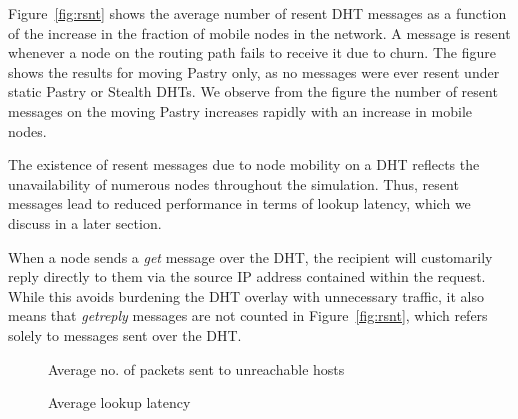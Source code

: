 \documentclass[times, 10pt,twocolumn]{article}
\begin{document}


Figure~\ref{fig:rsnt} shows the average number of resent DHT
messages as a function of the increase in the fraction of mobile
nodes in the network. A message is resent whenever a node on the
routing path fails to receive it due to churn. The figure shows the
results for moving Pastry only, as no messages were ever resent
under static Pastry or Stealth DHTs. We observe from the figure the
number of resent messages on the moving Pastry increases rapidly
with an increase in mobile nodes.

The existence of resent messages due to node mobility on a DHT
reflects the unavailability of numerous nodes throughout the
simulation. Thus, resent messages lead to reduced performance in
terms of lookup latency, which we discuss in a later section.


When a node sends a {\em get} message over the DHT, the recipient
will customarily reply directly to them via the source IP address
contained within the request. While this avoids burdening the DHT
overlay with unnecessary traffic, it also means that {\em getreply}
messages are not counted in Figure~\ref{fig:rsnt}, which refers
solely to messages sent over the DHT.

\begin{figure}[tbp]
\centering {}
\caption{Average no. of packets sent to unreachable hosts}
\label{fig:unreach}
\end{figure}

\begin{figure}[tbp]
\centering {}
\caption{Average lookup latency} \label{fig:latency}
\end{figure}
\end{document}
